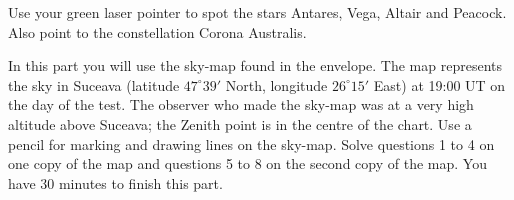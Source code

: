 
Use your green laser pointer to spot the stars Antares, Vega, Altair and
Peacock. Also point to the constellation Corona Australis.

In this part you will use the sky-map found in the envelope. The map
represents the sky in Suceava (latitude $47^\circ 39'$ North, longitude
$26^\circ 15'$ East) at 19:00 UT on the day of the test. The observer who
made the sky-map was at a very high altitude above Suceava; the Zenith point
is in the centre of the chart. Use a pencil for marking and drawing lines on
the sky-map. Solve questions 1 to 4 on one copy of the map and questions 5
to 8 on the second copy of the map. You have 30 minutes to finish this part.

